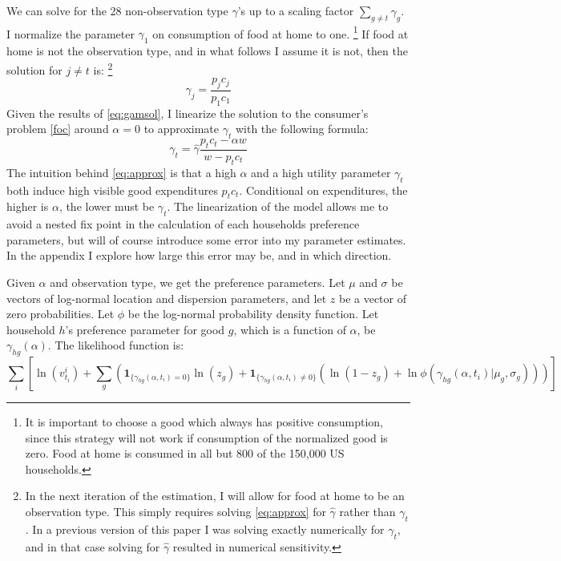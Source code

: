 \documentclass[12pt]{article}
\begin{document}
We can solve for the 28 non-observation type $\gamma$'s up to a scaling factor $\sum_{g\neq t}\gamma_g$.
I normalize the parameter $\gamma_1$ on consumption of food at home to one. 
\footnote{It is important to choose a good which always has positive consumption, since this strategy will not work if consumption of the normalized good is zero.  
Food at home is consumed in all but 800 of the 150,000 US households.}
If food at home is not the observation type, and in what follows I assume it is not, then the solution for $j \neq t$ is:
\footnote{In the next iteration of the estimation, I will allow for food at home to be an observation type.  This simply requires solving \eqref{eq:approx} for $\hat{\gamma}$ rather than $\gamma_t$.  In a previous version of this paper I was solving exactly numerically for $\gamma_t$, and in that case solving for $\hat{\gamma}$ resulted in numerical sensitivity.}
\begin{equation}
	\label{eq:gamsol}
	\gamma_j = \frac{p_j c_j}{p_1 c_1}
\end{equation}
Given the results of \eqref{eq:gamsol}, I linearize the solution to the consumer's problem \eqref{foc} around $\alpha = 0$ to approximate $\gamma_t$ with the following formula:
\begin{equation}
    \label{eq:approx}
    \gamma_t = \hat{\gamma} \frac{p_t c_t - \alpha w}{w - p_t c_t}
\end{equation}
The intuition behind \eqref{eq:approx} is that a high $\alpha$ and a high utility parameter $\gamma_t$ both induce high visible good expenditures $p_t c_t$. Conditional on expenditures, the higher is $\alpha$, the lower must be $\gamma_t$.  The linearization of the model allows me to avoid a nested fix point in the calculation of each households preference parameters, but will of course introduce some error into my parameter estimates.  In the appendix I explore how large this error may be, and in which direction.

Given $\alpha$ and observation type, we get the preference parameters.  Let $\mu$ and $\sigma$ be vectors of log-normal location and dispersion parameters, and let $z$ be a vector of zero probabilities. Let $\phi$ be the log-normal probability density function. Let household $h$'s preference parameter for good $g$, which is a function of $\alpha$, be $\gamma_{hg}(\alpha)$.  The likelihood function is:
\begin{equation}
	\label{lik1}
    \sum_{i}\left[ \ln(v^i_{t_i}) + \sum_{g} \left(\mathbf{1}_{\{\gamma_{hg}(\alpha, t_i) = 0\}}\ln\left(z_g\right) + \mathbf{1}_{\{\gamma_{hg}(\alpha, t_i) \neq 0\}} \left(\ln\left(1 - z_g\right)+\ln \phi(\gamma_{hg}(\alpha, t_i)|\mu_g,\sigma_g)\right)\right)\right]
\end{equation}
\end{document}
